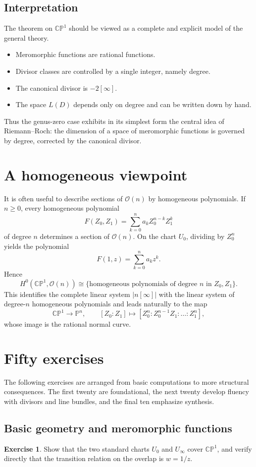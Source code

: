 \documentclass[11pt]{article}
\newcommand{\CP}{\mathbb{CP}}
\newcommand{\PP}{\mathbb{P}}
\newcommand{\OO}{\mathcal{O}}
\newcommand{\CPone}{\CP^1}
\theoremstyle{plain}
\theoremstyle{definition}
\newtheorem{exercise}{Exercise}
\begin{document}
\subsection{Interpretation}
The theorem on $\CPone$ should be viewed as a complete and explicit model of the general theory.

\begin{itemize}
    \item Meromorphic functions are rational functions.
    \item Divisor classes are controlled by a single integer, namely degree.
    \item The canonical divisor is $-2[\infty]$.
    \item The space $L(D)$ depends only on degree and can be written down by hand.
\end{itemize}

Thus the genus-zero case exhibits in its simplest form the central idea of Riemann--Roch: the dimension of a space of meromorphic functions is governed by degree, corrected by the canonical divisor.

\section{A homogeneous viewpoint}
It is often useful to describe sections of $\OO(n)$ by homogeneous polynomials. If $n\ge 0$, every homogeneous polynomial
\[
F(Z_0,Z_1)=\sum_{k=0}^{n} a_k Z_0^{n-k}Z_1^k
\]
of degree $n$ determines a section of $\OO(n)$. On the chart $U_0$, dividing by $Z_0^n$ yields the polynomial
\[
F(1,z)=\sum_{k=0}^{n} a_k z^k.
\]
Hence
\[
H^0(\CPone,\OO(n))\cong \{\text{homogeneous polynomials of degree $n$ in $Z_0,Z_1$}\}.
\]
This identifies the complete linear system $|n[\infty]|$ with the linear system of degree-$n$ homogeneous polynomials and leads naturally to the map
\[
\CPone\longrightarrow \PP^n,
\qquad
[Z_0:Z_1]\longmapsto [Z_0^n:Z_0^{n-1}Z_1:\dots:Z_1^n],
\]
whose image is the rational normal curve.

\section{Fifty exercises}
The following exercises are arranged from basic computations to more structural consequences. The first twenty are foundational, the next twenty develop fluency with divisors and line bundles, and the final ten emphasize synthesis.

\subsection*{Basic geometry and meromorphic functions}
\begin{exercise}
Show that the two standard charts $U_0$ and $U_{\infty}$ cover $\CPone$, and verify directly that the transition relation on the overlap is $w=1/z$.
\end{exercise}
\end{document}
